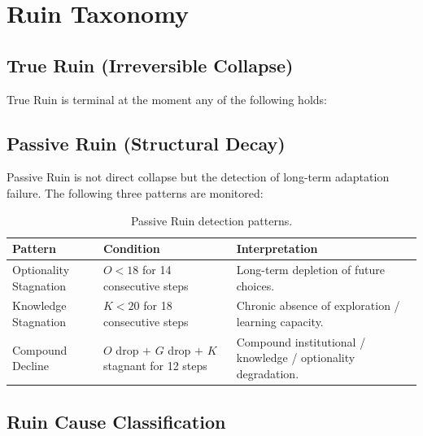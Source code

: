 \section{Ruin Taxonomy}
\label{sec:vnext-ruin-taxonomy}

\subsection{True Ruin (Irreversible Collapse)}
\label{sec:vnext-true-ruin}

True Ruin is terminal at the moment any of the following holds:


\subsection{Passive Ruin (Structural Decay)}
\label{sec:vnext-passive-ruin}

Passive Ruin is not direct collapse but the detection of long-term
adaptation failure. The following three patterns are monitored:

\begin{table}[ht]
\centering
\small
\begin{tabularx}{\linewidth}{lXX}
\toprule
\textbf{Pattern} & \textbf{Condition} & \textbf{Interpretation} \\
\midrule
Optionality Stagnation
& $O < 18$ for 14 consecutive steps
& Long-term depletion of future choices. \\

Knowledge Stagnation
& $K < 20$ for 18 consecutive steps
& Chronic absence of exploration / learning capacity. \\

Compound Decline
& $O$ drop $+$ $G$ drop $+$ $K$ stagnant for 12 steps
& Compound institutional / knowledge / optionality degradation. \\

\bottomrule
\end{tabularx}
\caption[Passive ruin patterns]{Passive Ruin detection patterns.}
\label{tab:vnext-passive-patterns}
\end{table}

\subsection{Ruin Cause Classification}
\label{sec:vnext-ruin-cause-classification}

